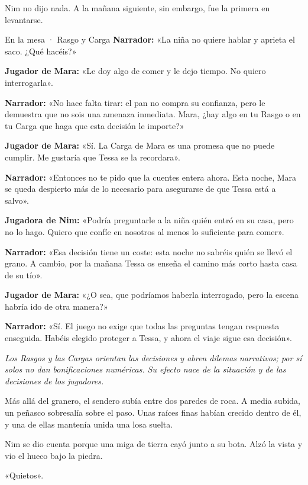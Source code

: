 \documentclass[10pt,a4paper]{article}
\begin{document}
Nim no dijo nada. A la mañana siguiente, sin embargo, fue la primera en levantarse.
\begin{rpgexample}{En la mesa · Rasgo y Carga}
\textbf{Narrador:} «La niña no quiere hablar y aprieta el saco. ¿Qué hacéis?»

\textbf{Jugador de Mara:} «Le doy algo de comer y le dejo tiempo. No quiero interrogarla».

\textbf{Narrador:} «No hace falta tirar: el pan no compra su confianza, pero le demuestra que no sois una amenaza inmediata. Mara, ¿hay algo en tu Rasgo o en tu Carga que haga que esta decisión le importe?»

\textbf{Jugador de Mara:} «Sí. La Carga de Mara es una promesa que no puede cumplir. Me gustaría que Tessa se la recordara».

\textbf{Narrador:} «Entonces no te pido que la cuentes entera ahora. Esta noche, Mara se queda despierto más de lo necesario para asegurarse de que Tessa está a salvo».

\textbf{Jugadora de Nim:} «Podría preguntarle a la niña quién entró en su casa, pero no lo hago. Quiero que confíe en nosotros al menos lo suficiente para comer».

\textbf{Narrador:} «Esa decisión tiene un coste: esta noche no sabréis quién se llevó el grano. A cambio, por la mañana Tessa os enseña el camino más corto hasta casa de su tío».

\textbf{Jugador de Mara:} «¿O sea, que podríamos haberla interrogado, pero la escena habría ido de otra manera?»

\textbf{Narrador:} «Sí. El juego no exige que todas las preguntas tengan respuesta enseguida. Habéis elegido proteger a Tessa, y ahora el viaje sigue esa decisión».

\emph{Los Rasgos y las Cargas orientan las decisiones y abren dilemas narrativos; por sí solos no dan bonificaciones numéricas. Su efecto nace de la situación y de las decisiones de los jugadores.}

\end{rpgexample}
Más allá del granero, el sendero subía entre dos paredes de roca. A media subida, un peñasco sobresalía sobre el paso. Unas raíces finas habían crecido dentro de él, y una de ellas mantenía unida una losa suelta.

Nim se dio cuenta porque una miga de tierra cayó junto a su bota. Alzó la vista y vio el hueco bajo la piedra.

«Quietos».
\end{document}
